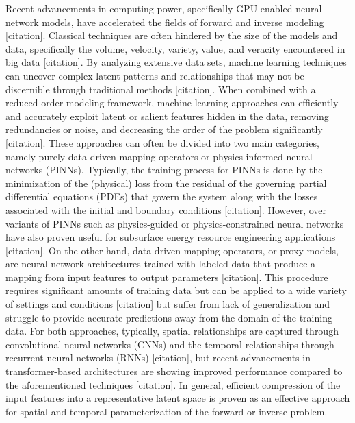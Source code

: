 \documentclass[10pt, twoside]{article}
\begin{document}
Recent advancements in computing power, specifically GPU-enabled neural network models, have accelerated the fields of forward and inverse modeling [citation]. Classical techniques are often hindered by the size of the models and data, specifically the volume, velocity, variety, value, and veracity encountered in big data [citation]. By analyzing extensive data sets, machine learning techniques can uncover complex latent patterns and relationships that may not be discernible through traditional methods [citation]. When combined with a reduced-order modeling framework, machine learning approaches can efficiently and accurately exploit latent or salient features hidden in the data, removing redundancies or noise, and decreasing the order of the problem significantly [citation]. These approaches can often be divided into two main categories, namely purely data-driven mapping operators or physics-informed neural networks (PINNs). Typically, the training process for PINNs is done by the minimization of the (physical) loss from the residual of the governing partial differential equations (PDEs) that govern the system along with the losses associated with the initial and boundary conditions [citation]. However, over variants of PINNs such as physics-guided or physics-constrained neural networks have also proven useful for subsurface energy resource engineering applications [citation]. On the other hand, data-driven mapping operators, or proxy models, are neural network architectures trained with labeled data that produce a mapping from input features to output parameters [citation]. This procedure requires significant amounts of training data but can be applied to a wide variety of settings and conditions [citation] but suffer from lack of generalization and struggle to provide accurate predictions away from the domain of the training data. For both approaches, typically, spatial relationships are captured through convolutional neural networks (CNNs) and the temporal relationships through recurrent neural networks (RNNs) [citation], but recent advancements in transformer-based architectures are showing improved performance compared to the aforementioned techniques [citation]. In general, efficient compression of the input features into a representative latent space is proven as an effective approach for spatial and temporal parameterization of the forward or inverse problem.
\end{document}
